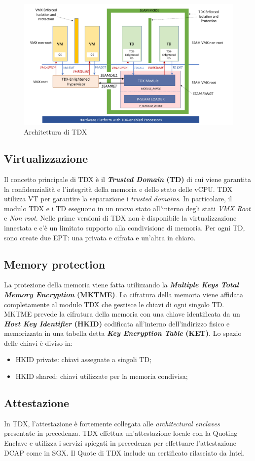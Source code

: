 \documentclass{article}
\begin{document}
\begin{figure}[h]
  \begin{center}
    \includegraphics[width=.65\textwidth]{figures/tdx-architecture.png}
  \end{center}
  \caption{Architettura di TDX}\label{fig:tdx-architecture}
\end{figure}

\subsection{Virtualizzazione}
Il concetto principale di TDX è il \textbf{\textit{Trusted Domain} (TD)} di cui viene garantita la confidenzialità e l'integrità della memoria e dello stato delle vCPU. TDX utilizza VT per garantire la separazione i \textit{trusted domains}. In particolare, il modulo TDX e i TD eseguono in un nuovo stato all'interno degli stati \textit{VMX Root} e \textit{Non root}. Nelle prime versioni di TDX non è disponibile la virtualizzazione innestata e c'è un limitato supporto alla condivisione di memoria. Per ogni TD, sono create due EPT: una privata e cifrata e un'altra in chiaro.
\subsection{Memory protection}
La protezione della memoria viene fatta utilizzando la \textbf{\textit{Multiple Keys Total Memory Encryption} (MKTME)}. La cifratura della memoria viene affidata completamente al modulo TDX che gestisce le chiavi di ogni singolo TD. MKTME prevede la cifratura della memoria con una chiave identificata da un \textbf{\textit{Host Key Identifier} (HKID)} codificata all'interno dell'indirizzo fisico e memorizzata in una tabella detta \textbf{\textit{Key Encryption Table} (KET)}. Lo spazio delle chiavi è diviso in:
\begin{itemize}
  \item HKID private: chiavi assegnate a singoli TD;
  \item HKID shared: chiavi utilizzate per la memoria condivisa;
\end{itemize}
\subsection{Attestazione}
In TDX, l'attestazione è fortemente collegata alle \textit{architectural enclaves} presentate in precedenza. TDX effettua un'attestazione locale con la Quoting Enclave e utilizza i servizi spiegati in precedenza per effettuare l'attestazione DCAP come in SGX. Il Quote di TDX include un certificato rilasciato da Intel.

\clearpage
\pagestyle{plain}
\setcounter{page}{1}


\end{document}
